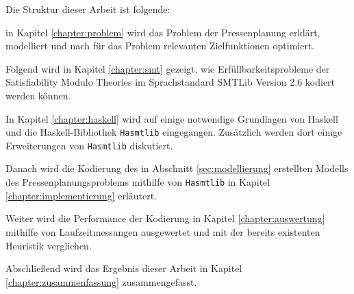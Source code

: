
Die Struktur dieser Arbeit ist folgende:

in Kapitel \ref{chapter:problem} wird das Problem der Pressenplanung erklärt, modelliert und nach für das Problem relevanten Zielfunktionen optimiert.

Folgend wird in Kapitel \ref{chapter:smt} gezeigt, wie Erfüllbarkeitsprobleme der Satisfiability Modulo Theories im Sprachstandard SMTLib Version 2.6 kodiert werden können.

In Kapitel \ref{chapter:haskell} wird auf einige notwendige Grundlagen von Haskell und die Haskell-Bibliothek \texttt{Hasmtlib} eingegangen.
Zusätzlich werden dort einige Erweiterungen von \texttt{Hasmtlib} diskutiert.

Danach wird die Kodierung des in Abschnitt \ref{sec:modellierung} erstellten Modells des Pressenplanungsproblems mithilfe von \texttt{Hasmtlib}
in Kapitel \ref{chapter:implementierung} erläutert.

Weiter wird die Performance der Kodierung in Kapitel \ref{chapter:auswertung} mithilfe von Laufzeitmessungen ausgewertet und mit der bereits existenten Heuristik verglichen.

Abschließend wird das Ergebnis dieser Arbeit in Kapitel \ref{chapter:zusammenfassung} zusammengefasst.